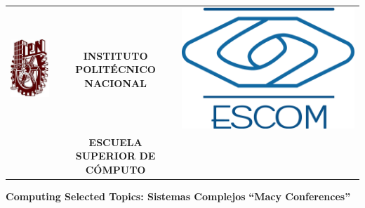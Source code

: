 \begin{titlepage}
    \begin{center}
    \begin{tabular}{r c l}
    \includegraphics[scale=.20]{images/ipn} & \textbf{INSTITUTO POLIT\'ECNICO NACIONAL} & \includegraphics[scale=.20]{images/escom}\\
    & \textbf{ESCUELA SUPERIOR DE C\'OMPUTO}
    \end{tabular}
    \end{center}


    \vspace{1.5cm}
    \begin{center}


    \textbf{Computing Selected Topics:  Sistemas Complejos} \linebreak
    \large \textbf{``Macy Conferences''} \linebreak


\end{center}
\end{titlepage}
